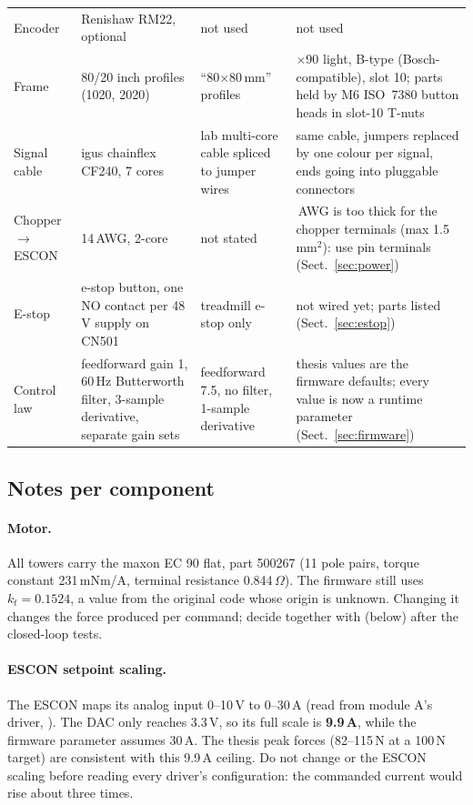 {\begin{longtable}{>{\raggedright}p{2.6cm} >{\raggedright}p{3.9cm} >{\raggedright}p{3.6cm} >{\raggedright\arraybackslash}p{4.6cm}}
Encoder & Renishaw RM22, optional & not used & not used \\
Frame & 80/20 inch profiles (1020, 2020) & ``80$\times$80\,mm'' profiles & 90$\times$90 light, B-type (Bosch-compatible), slot 10; parts held by M6 ISO~7380 button heads in slot-10 T-nuts \\
Signal cable & igus chainflex CF240, 7 cores & lab multi-core cable spliced to jumper wires & same cable, jumpers replaced by one colour per signal, ends going into pluggable connectors \\
Chopper $\rightarrow$ ESCON & 14\,AWG, 2-core & not stated & 14\,AWG is too thick for the chopper terminals (max 1.5\,mm$^2$): use pin terminals (Sect.~\ref{sec:power}) \\
E-stop & e-stop button, one NO contact per 48\,V supply on CN501 & treadmill e-stop only & not wired yet; parts listed (Sect.~\ref{sec:estop}) \\
Control law & feedforward gain 1, 60\,Hz Butterworth filter, 3-sample derivative, separate gain sets & feedforward 7.5, no filter, 1-sample derivative & thesis values are the firmware defaults; every value is now a runtime parameter (Sect.~\ref{sec:firmware}) \\
\end{longtable}
}

\subsection{Notes per component}

\paragraph{Motor.} All towers carry the maxon EC 90 flat, part 500267 (11 pole pairs, torque constant
231\,mNm/A, terminal resistance 0.844\,$\Omega$). The firmware still uses $k_t = 0.1524$, a value from the
original code whose origin is unknown. Changing it changes the force produced per command; decide together
with  (below) after the closed-loop tests.

\paragraph{ESCON setpoint scaling.} The ESCON maps its analog input 0--10\,V to 0--30\,A (read from module
A's driver, ). The DAC only reaches 3.3\,V, so its full scale is
\textbf{9.9\,A}, while the firmware parameter  assumes 30\,A. The thesis peak forces
(82--115\,N at a 100\,N target) are consistent with this 9.9\,A ceiling. Do not change  or the
ESCON scaling before reading every driver's configuration: the commanded current would rise about three times.

